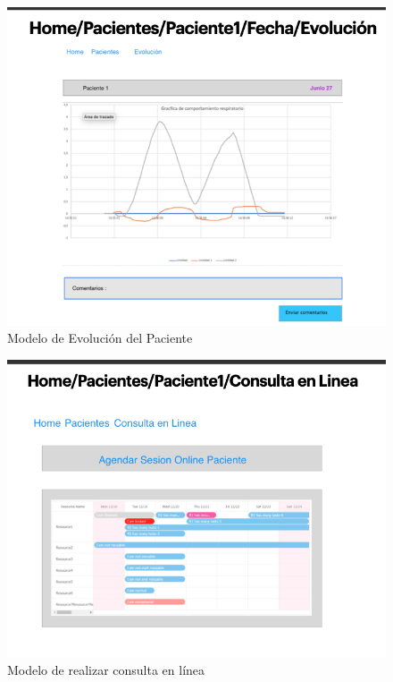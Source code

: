 \documentclass[12pt]{article}
\begin{document}
\begin{figure}[ht]
\centering
\includegraphics[scale=0.4]{imag/P9.png}
\caption{Modelo de Evolución del Paciente }
\label{6}
\end{figure}
\FloatBarrier


\begin{figure}[ht]
\centering
\includegraphics[scale=0.4]{imag/P10.png}
\caption{ Modelo de realizar consulta en línea}
\label{6}
\end{figure}
\FloatBarrier
\end{document}
